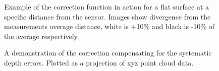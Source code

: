 \documentclass[]{article}
\begin{document}
{\begin{figure}[htb]
	\centering     %
	 \;
	\caption{Example of the correction function in action for a flat surface at a specific distance from the sensor. Images show divergence from the measurements average distance, white is +10\% and black is -10\% of the average respectively.}
	\label{fig:beforeAfter}
\end{figure}
\begin{figure}[htb]
	\centering     %
	 \;
	\caption{A demonstration of the correction compensating for the systematic depth errors. Plotted as a projection of xyz point cloud data.}
	\label{fig:outputTest}
\end{figure}

}
\end{document}
